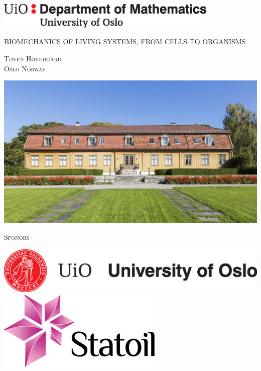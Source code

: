 \documentclass{article}
\begin{document}
\newenvironment{changemargin}[2]{%
\begin{list}{}{%
\setlength{\topsep}{0pt}%
\setlength{\leftmargin}{#1}%
\setlength{\rightmargin}{#2}%
\setlength{\listparindent}{\parindent}%
\setlength{\itemindent}{\parindent}%
\setlength{\parsep}{\parskip}%
}%
\item[]}{\end{list}}

\begin{titlepage}
	\centering
	\includegraphics[width=0.8\textwidth]{img/mat-mn-navn-eng.eps}\par\vspace{1cm}
	{\scshape\LARGE BIOMECHANICS OF LIVING SYSTEMS, FROM CELLS TO ORGANISMS \par}
	\vspace{1cm}
	{\scshape\Large Tøyen Hovedgård \\ Oslo Norway\par}
	\vspace{1.5cm}

\begin{changemargin}{-1cm}{-1cm}

\includegraphics[scale=0.4]{img/hoved.jpg}

\centering
\vspace{0.5cm}
{\scshape\Large  Sponors}
\vspace{0.5cm}



\includegraphics[scale=0.45]{01-UiO-Hovedlogo/English/UiO_Seal_B_ENG_cmyk.eps}\hspace*{2cm}
\includegraphics[scale=0.45]{img/logo.png}
\end{changemargin}


\end{titlepage}
\end{document}
